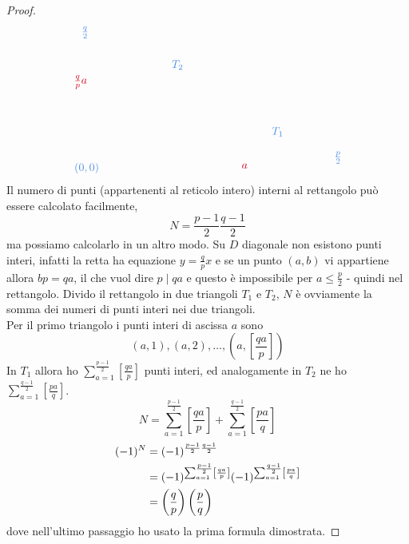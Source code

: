 \begin{proof}
\begin{equation*}
\begin{tikzpicture}[x=0.75pt,y=0.75pt,yscale=-1,xscale=1]
	\draw (153.4,202.6) node [anchor=north west][inner sep=0.75pt]    {$\textcolor[rgb]{0.29,0.56,0.89}{( 0,0)}$};
	\draw (162,39.4) node [anchor=north west][inner sep=0.75pt]    {$\textcolor[rgb]{0.29,0.56,0.89}{\frac{q}{2}}$};
	\draw (465,189.4) node [anchor=north west][inner sep=0.75pt]    {$\textcolor[rgb]{0.29,0.56,0.89}{\frac{p}{2}}$};
	\draw (354,204) node [anchor=north west][inner sep=0.75pt]    {$\textcolor[rgb]{0.82,0.01,0.11}{a}$};
	\draw (153,98) node [anchor=north west][inner sep=0.75pt]    {$\textcolor[rgb]{0.82,0.01,0.11}{\frac{q}{p}}\textcolor[rgb]{0.82,0.01,0.11}{a}$};
	\draw (390.2,160.2) node [anchor=north west][inner sep=0.75pt]    {$\textcolor[rgb]{0.29,0.56,0.89}{T_{1}}$};
	\draw (270.2,80.2) node [anchor=north west][inner sep=0.75pt]    {$\textcolor[rgb]{0.29,0.56,0.89}{T_{2}}$};
	\end{tikzpicture}
	\end{equation*}
		Il numero di punti (appartenenti al reticolo intero) interni al rettangolo può essere calcolato facilmente,
	\begin{equation*}
	N=\frac{p-1}{2}\frac{q-1}{2}
	\end{equation*}
	ma possiamo calcolarlo in un altro modo. Su $D$ diagonale non esistono punti interi, infatti la retta ha equazione $y=\frac{q}{p}x$ e se un punto $(a,b)$ vi appartiene allora $bp=qa$, il che vuol dire $p\mid qa$ e questo è impossibile per $a\leq\frac{p}{2}$ - quindi nel rettangolo. Divido il rettangolo in due triangoli $T_1$ e $T_2$, $N$ è ovviamente la somma dei numeri di punti interi nei due triangoli. \\ Per il primo triangolo i punti interi di ascissa $a$ sono
	\begin{equation*}
	\left(a,1\right),\left(a,2\right),\dots,\left(a,\left[\frac{qa}{p}\right]\right)
	\end{equation*}
	In $T_1$ allora ho $\sum_{a=1}^{\frac{p-1}{2}}\left[\frac{qa}{p}\right]$ punti interi, ed analogamente in $T_2$ ne ho $\sum_{a=1}^{\frac{q-1}{2}}\left[\frac{pa}{q}\right]$.
	\begin{equation*}
	N=\sum_{a=1}^{\frac{p-1}{2}}\left[\frac{qa}{p}\right]+\sum_{a=1}^{\frac{q-1}{2}}\left[\frac{pa}{q}\right]
	\end{equation*}
	\begin{align*}
	(-1)^N
	&=(-1)^{\frac{p-1}{2}\frac{q-1}{2}}\\
	&=(-1)^{\sum_{a=1}^{\frac{p-1}{2}}\left[\frac{qa}{p}\right]}(-1)^{\sum_{a=1}^{\frac{q-1}{2}}\left[\frac{pa}{q}\right]}\\
	&=\left(\frac{q}{p}\right)\left(\frac{p}{q}\right)
	\end{align*}
	dove nell'ultimo passaggio ho usato la prima formula dimostrata.   
\end{proof}




